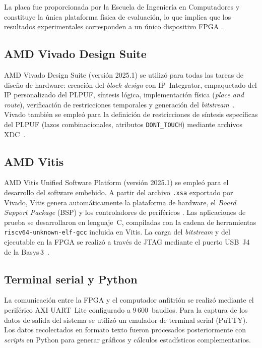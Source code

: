 La placa fue proporcionada por la Escuela de Ingeniería en Computadores y
constituye la única plataforma física de evaluación, lo que implica que los
resultados experimentales corresponden a un único dispositivo FPGA
\cite{wilde_2020_confidence}.

\subsection{AMD Vivado Design Suite}
\label{sec:hw_vivado}

AMD Vivado Design Suite (versión 2025.1) se utilizó para
todas las tareas de diseño de hardware: creación del \textit{block design}
con IP~Integrator, empaquetado del IP personalizado del PLPUF, síntesis
lógica, implementación física (\textit{place and route}), verificación de
restricciones temporales y generación del \textit{bitstream}~\cite{ug994}.
Vivado también se empleó para la definición de restricciones de síntesis
específicas del PLPUF (lazos combinacionales, atributos \texttt{DONT\_TOUCH})
mediante archivos XDC~\cite{ug1037}.

\subsection{AMD Vitis}
\label{sec:hw_vitis}

AMD Vitis Unified Software Platform (versión 2025.1) se empleó para el
desarrollo del software embebido. A partir del archivo \texttt{.xsa}
exportado por Vivado, Vitis genera automáticamente la plataforma de hardware,
el \textit{Board Support Package} (BSP) y los controladores de periféricos
\cite{ug1701}. Las aplicaciones de prueba se desarrollaron en lenguaje~C,
compiladas con la cadena de herramientas \texttt{riscv64-unknown-elf-gcc}
incluida en Vitis. La carga del \textit{bitstream} y del ejecutable en la
FPGA se realizó a través de JTAG mediante el puerto USB~J4 de la
Basys\,3~\cite{ug1701}.

\subsection{Terminal serial y Python}
\label{sec:hw_terminal}

La comunicación entre la FPGA y el computador anfitrión se realizó mediante
el periférico AXI UART~Lite configurado a 9\,600~baudios. Para la captura de
los datos de salida del sistema se utilizó un emulador de terminal serial
(PuTTY). Los datos recolectados en formato texto fueron
procesados posteriormente con \textit{scripts} en Python para generar
gráficos y cálculos estadísticos complementarios.

